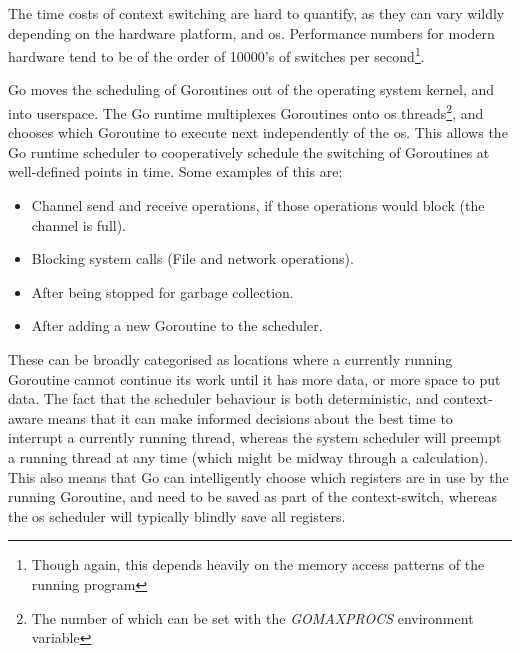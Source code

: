 The time costs of context switching are hard to quantify, as they can vary
wildly depending on the hardware platform, and \gls{os}. Performance
numbers for modern hardware tend to be of the order of 10000's of switches per
second\footnote{Though again, this depends heavily on the memory access patterns
of the running program}.

Go moves the scheduling of Goroutines out of the operating system kernel, and
into userspace. The Go runtime multiplexes Goroutines onto \gls{os}
threads\footnote{The number of which can be set with the \textit{GOMAXPROCS}
environment variable}, and chooses which Goroutine to execute next independently
of the \gls{os}. This allows the Go runtime scheduler to cooperatively schedule
the switching of Goroutines at well-defined points in time. Some examples of
this are\cite{performanceWithoutTheEventLoop}:

\begin{itemize}
  \item Channel send and receive operations, if those operations would block (the channel is full).
  \item Blocking system calls (File and network operations).
  \item After being stopped for garbage collection.
  \item After adding a new Goroutine to the scheduler.
\end{itemize}

These can be broadly categorised as locations where a currently running
Goroutine cannot continue its work until it has more data, or more space to put
data. The fact that the scheduler behaviour is both deterministic, and
context-aware means that it can make informed decisions about the best time to
interrupt a currently running thread, whereas the system scheduler will preempt
a running thread at any time (which might be midway through a calculation). This
also means that Go can intelligently choose which registers are in use by the
running Goroutine, and need to be saved as part of the context-switch, whereas
the \gls{os} scheduler will typically blindly save all registers.


